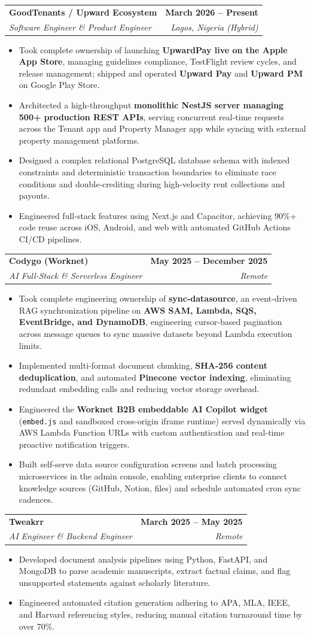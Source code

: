 \documentclass[10pt,letterpaper]{article}
\makeatletter
\newcommand{\resumeHeading}[4]{%
  \vspace{1.5pt}%
  \begin{tabularx}{\textwidth}{@{}>{\RaggedRight\arraybackslash}X r@{}}
    \textbf{#1} & \textbf{#2} \\
    \textit{#3} & \textit{#4} \\
  \end{tabularx}\vspace{-4pt}
}
\newcommand{\resumeItem}[1]{\item #1}
\makeatother
\begin{document}
\resumeHeading
{GoodTenants / Upward Ecosystem}
{March 2026 -- Present}
{Software Engineer \& Product Engineer}
{Lagos, Nigeria (Hybrid)}
\begin{itemize}
\resumeItem{Took complete ownership of launching \textbf{UpwardPay live on the Apple App Store}, managing guidelines compliance, TestFlight review cycles, and release management; shipped and operated \textbf{Upward Pay} and \textbf{Upward PM} on Google Play Store.}
\resumeItem{Architected a high-throughput \textbf{monolithic NestJS server managing 500+ production REST APIs}, serving concurrent real-time requests across the Tenant app and Property Manager app while syncing with external property management platforms.}
\resumeItem{Designed a complex relational PostgreSQL database schema with indexed constraints and deterministic transaction boundaries to eliminate race conditions and double-crediting during high-velocity rent collections and payouts.}
\resumeItem{Engineered full-stack features using Next.js and Capacitor, achieving 90\%+ code reuse across iOS, Android, and web with automated GitHub Actions CI/CD pipelines.}
\end{itemize}

\resumeHeading
{Codygo (Worknet)}
{May 2025 -- December 2025}
{AI Full-Stack \& Serverless Engineer}
{Remote}
\begin{itemize}
\resumeItem{Took complete engineering ownership of \textbf{sync-datasource}, an event-driven RAG synchronization pipeline on \textbf{AWS SAM, Lambda, SQS, EventBridge, and DynamoDB}, engineering cursor-based pagination across message queues to sync massive datasets beyond Lambda execution limits.}
\resumeItem{Implemented multi-format document chunking, \textbf{SHA-256 content deduplication}, and automated \textbf{Pinecone vector indexing}, eliminating redundant embedding calls and reducing vector storage overhead.}
\resumeItem{Engineered the \textbf{Worknet B2B embeddable AI Copilot widget} (\texttt{embed.js} and sandboxed cross-origin iframe runtime) served dynamically via AWS Lambda Function URLs with custom authentication and real-time proactive notification triggers.}
\resumeItem{Built self-serve data source configuration screens and batch processing microservices in the admin console, enabling enterprise clients to connect knowledge sources (GitHub, Notion, files) and schedule automated cron sync cadences.}
\end{itemize}

\resumeHeading
{Tweakrr}
{March 2025 -- May 2025}
{AI Engineer \& Backend Engineer}
{Remote}
\begin{itemize}
\resumeItem{Developed document analysis pipelines using Python, FastAPI, and MongoDB to parse academic manuscripts, extract factual claims, and flag unsupported statements against scholarly literature.}
\resumeItem{Engineered automated citation generation adhering to APA, MLA, IEEE, and Harvard referencing styles, reducing manual citation turnaround time by over 70\%.}
\end{itemize}
\end{document}
